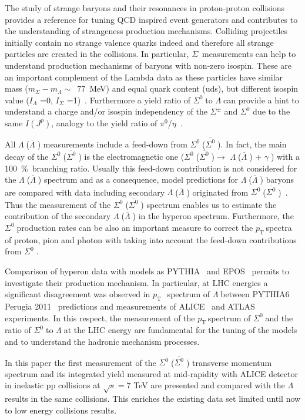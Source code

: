 \documentclass[ALICE,manyauthors]{cernphprep}
\newcommand{\sig}{\ensuremath{\Sigma^0  \; }}
\newcommand{\asig}{\ensuremath{\overline{\Sigma^0} \; }}
\newcommand{\gam}{\ensuremath{\gamma \; }}
\newcommand{\lam}{\ensuremath{\Lambda \; }}
\newcommand{\alam}{\ensuremath{\overline{\Lambda} \; }}
\newcommand{\pt}{\ensuremath{p_{\mathrm{T}\; }}}
\newcommand{\red}{\textcolor{red}}
\begin{document}
The study of strange baryons and their resonances in proton-proton collisions provides a reference for tuning QCD 
inspired event generators and contributes to the understanding of strangeness production mechanisms. Colliding projectiles initially 
contain no strange valence quarks indeed and therefore all strange particles are created in the 
collisions. In particular, $\Sigma$~measurements can help to understand production mechanisms of baryons with non-zero 
isospin. These are an important complement of the Lambda data as these particles have similar mass 
($m_{\Sigma} - m_{\Lambda} \sim$~77~MeV) and equal quark content (uds), but different isospin value 
($I_{\Lambda}$ =0, $I_{\Sigma}$ =1)~\cite{cite:PDG}. Furthermore a yield ratio of \sig to \lam can provide 
a hint to understand a charge and/or isospin independency of the $\Sigma^\pm$ and $\Sigma^0$ due to the same $I(J^p)$, 
analogy to the yield ratio of $\pi^0$/$\eta$\red{~\cite{cite:pi_eta}}.

All \lam (\alam) measurements include a feed-down from \sig (\asig). In fact, the main decay of the \sig (\asig) is the 
electromagnetic one (\sig (\asig)$\to $ \lam (\alam) + \gam) with a 100~\%~branching ratio. Usually this feed-down contribution 
is not considered for the \lam (\alam) spectrum and as a consequence, model predictions for \lam (\alam) baryons are 
compared with data including secondary \lam (\alam) originated from \sig (\asig)\red{~\cite{cite:lamda_model}}. 
Thus the measurement of the \sig (\asig) spectrum enables us to estimate the contribution of the secondary \lam (\alam) 
in the hyperon spectrum. Furthermore, the \sig production rates can be also an important measure to correct the \pt spectra of
proton, pion and photon with taking into account the feed-down contributions from \sig.

Comparison of hyperon data with models as  PYTHIA~\cite{cite:pythia6} and EPOS~\cite{cite:EPOS3} permits 
to investigate their production mechanism. In particular, at LHC energies a significant disagreement was observed in 
\pt~spectrum of \lam between PYTHIA6 Perugia 2011~\cite{cite:pythia6} predictions and measurements of 
ALICE~\cite{cite:DDChin-Lam} and ATLAS~\cite{cite:ATLAS-Lam-pp-2011} experiments. 
In this respect, the measurement of the \pt spectrum of  \sig and the ratio of \sig to \lam at the LHC energy
are fundamental for the tuning of the models and to understand the hadronic mechanism 
processes.

In this paper the first measurement of the \sig (\asig) transverse momentum spectrum and its integrated yield measured 
at mid-rapidity with ALICE detector in inelastic pp collisions at $\sqrt{s} =$7 TeV are presented and compared
with the \lam results in the same collisions. This enriches the existing data set limited until now to low energy collisions results. 
\end{document}
